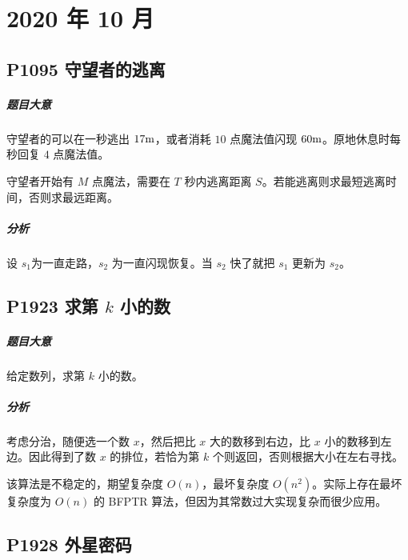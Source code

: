 \chapter{2020 年 10 月}

\section{P1095 守望者的逃离}

\paragraph{题目大意}

守望者的可以在一秒逃出 $17 {\rm m}$，或者消耗 $10$ 点魔法值闪现 $60 {\rm m}$。原地休息时每秒回复 $4$ 点魔法值。

守望者开始有 $M$ 点魔法，需要在 $T$ 秒内逃离距离 $S$。若能逃离则求最短逃离时间，否则求最远距离。

\paragraph{分析}

设 $s_1$为一直走路，$s_2$ 为一直闪现恢复。当 $s_2$ 快了就把 $s_1$ 更新为 $s_2$。

\section{P1923 求第 $k$ 小的数}

\paragraph{题目大意}

给定数列，求第 $k$ 小的数。

\paragraph{分析}

考虑分治，随便选一个数 $x$，然后把比 $x$ 大的数移到右边，比 $x$ 小的数移到左边。因此得到了数 $x$ 的排位，若恰为第 $k$ 个则返回，否则根据大小在左右寻找。

该算法是不稳定的，期望复杂度 $O(n)$，最坏复杂度 $O(n^2)$。实际上存在最坏复杂度为 $O(n)$ 的 BFPTR 算法，但因为其常数过大实现复杂而很少应用。

\section{P1928 外星密码}

